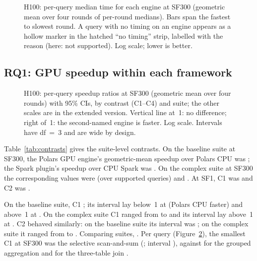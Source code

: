 \documentclass[sigconf, nonacm]{acmart}
\begin{document}
\begin{figure}[t]
\centering
{}
\caption{H100: per-query median time for each engine at SF300 (geometric mean
over four rounds of per-round medians). Bars span the fastest to slowest round.
A query with no timing on an engine appears as a hollow marker in the hatched
``no timing'' strip, labelled with the reason (here: not supported). Log scale;
lower is better. \chartnote}
\label{fig:f10}
\end{figure}

\subsection{RQ1: GPU speedup within each framework}
\label{sec:rq1}

\begin{figure}[t]
\centering
{}
\caption{H100: per-query speedup ratios at SF300 (geometric mean over four
rounds) with 95\% CIs, by contrast (C1--C4) and suite; the other scales are in
the extended version. Vertical line at~1: no difference; right of~1: the
second-named engine is faster. Log scale. Intervals have df~=~3 and are wide by
design. \chartnote}
\label{fig:f1}
\end{figure}

Table~\ref{tab:contrasts} gives the suite-level contrasts. On the baseline
suite at SF300, the Polars GPU engine's geometric-mean speedup over Polars CPU
was ; the Spark plugin's speedup over CPU Spark was
. On the complex suite at SF300 the corresponding
values were  (over
 supported queries) and
. At SF1, C1 was  and C2
was .

On the baseline suite, C1 ; its interval lay
below~1 at  (Polars CPU faster) and above~1 at
. On the complex suite C1 ranged from
 to  and its interval
lay above~1 at . C2 behaved similarly: on the
baseline suite its interval was ; on the
complex suite it ranged from  to
. Comparing suites,
. Per query (Figure~\ref{fig:f1}), the smallest C1 at SF300 was the
selective scan-and-sum  (; interval
), against
 for the grouped aggregation  and
 for the three-table join .
\end{document}

